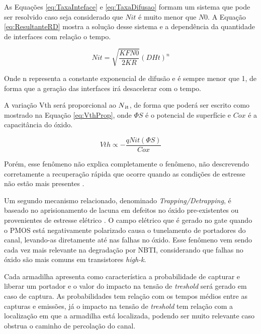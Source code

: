 As Equações \ref{eq:TaxaInteface} e \ref{eq:TaxaDifusao} formam um sistema que pode ser resolvido caso seja considerado que $N\scriptstyle{it}$ é muito menor que $N\scriptstyle{0}$. A Equação \ref{eq:ResultanteRD} mostra a solução desse sistema e a dependência da quantidade de interfaces com relação o tempo.

\begin{equation}
    \label{eq:ResultanteRD}
    N{\scriptstyle it} = \sqrt{\frac{K{\scriptstyle F}N{\scriptstyle 0}}{2K{\scriptstyle R}}}(D{\scriptstyle H}t)^{n}
\end{equation}

Onde n representa a constante exponencial de difusão e é sempre menor que 1, de forma que a geração das interfaces irá desacelerar com o tempo.

A variação Vth será proporcional ao $N\textsubscript{it}$, de forma que poderá ser escrito como mostrado na Equação \ref{eq:VthProp}, onde $\Phi\scriptstyle{S}$ é o potencial de superfície e $C{\scriptstyle ox}$ é a capacitância do óxido.

\begin{equation}
    \label{eq:VthProp}
    V{\scriptstyle th} \propto - \frac{qN{\scriptstyle it}(\Phi{\scriptstyle S})}{C{\scriptstyle ox}}
\end{equation}

Porém, esse fenômeno não explica completamente o fenômeno, não descrevendo corretamente a recuperação rápida que ocorre quando as condições de estresse não estão mais presentes \cite{Gilson}.

Um segundo mecanismo relacionado, denominado \textit{Trapping/Detrapping}, é baseado no aprisionamento de lacuna em defeitos no óxido pre-existentes ou provenientes de estresse elétrico \cite{Butzen}. O campo elétrico que é gerado no gate quando o PMOS está negativamente polarizado causa o tunelamento de portadores do canal, levando-as diretamente até nas falhas no óxido. Esse fenômeno vem sendo cada vez mais relevante na degradação por NBTI, considerando que falhas no óxido são mais comuns em transistores \textit{high-k}.

Cada armadilha apresenta como característica a probabilidade de capturar e liberar um portador e o valor do impacto na tensão de \textit{treshold} será gerado em caso de captura. As probabilidades tem relação com os tempos médios entre as capturas e emissões, já o impacto na tensão de \textit{treshold} tem relação com a localização em que a armadilha está localizada, podendo ser muito relevante caso obstrua o caminho de percolação do canal. 

